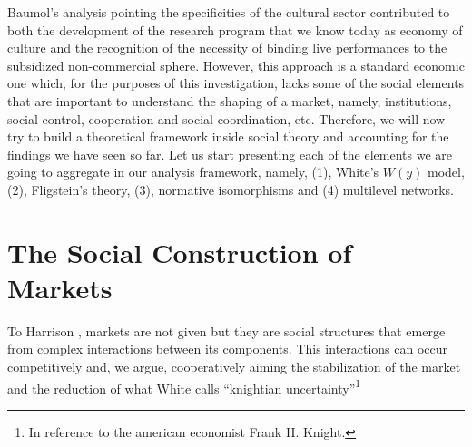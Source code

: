 \documentclass[a4paper, 12pt, openright, oneside, german, french, brazil, english]{abntex2}
\begin{document}
	Baumol's analysis pointing the specificities of the cultural sector contributed to both the development of the research program that we know today as economy of culture and the recognition of the necessity of binding live performances to the subsidized non-commercial sphere. However, this approach is a standard economic one which, for the purposes of this investigation, lacks some of the social elements that are important to understand the shaping of a market, namely, institutions, social control, cooperation and social coordination, etc. Therefore, we will now try to build a theoretical framework inside social theory and accounting for the findings we have seen so far. Let us start presenting each of the elements we are going to aggregate in our analysis framework, namely, (1), White's $W(y)$ model, (2), Fligstein's theory, (3), normative isomorphisms and (4) multilevel networks.
	
	
	\chapter{The Social Construction of Markets}
	
	
	To Harrison , markets are not given but they are social structures that emerge from complex interactions between its components. This interactions can occur competitively and, we argue, cooperatively aiming the stabilization of the market and the reduction of what White calls ``knightian uncertainty''\footnote{In reference to the american economist Frank H. Knight.}
	
\end{document}
